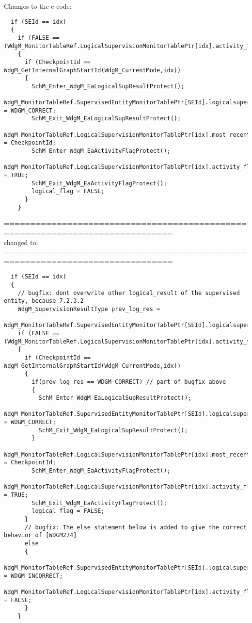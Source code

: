 \documentclass[11pt,a4paper]{article}
\begin{document}
\lstset{language=c}

Changes to the c-code:
\begin{lstlisting}
  if (SEId == idx)
  {
    if (FALSE == (WdgM_MonitorTableRef.LogicalSupervisionMonitorTablePtr[idx].activity_flag))
    {
      if (CheckpointId == WdgM_GetInternalGraphStartId(WdgM_CurrentMode,idx))
      {
        SchM_Enter_WdgM_EaLogicalSupResultProtect();
        WdgM_MonitorTableRef.SupervisedEntityMonitorTablePtr[SEId].logicalsupervision_result = WDGM_CORRECT;
        SchM_Exit_WdgM_EaLogicalSupResultProtect();
        WdgM_MonitorTableRef.LogicalSupervisionMonitorTablePtr[idx].most_recently_reported = CheckpointId;
        SchM_Enter_WdgM_EaActivityFlagProtect();
        WdgM_MonitorTableRef.LogicalSupervisionMonitorTablePtr[idx].activity_flag = TRUE;
        SchM_Exit_WdgM_EaActivityFlagProtect();
        logical_flag = FALSE;
      }
    }
\end{lstlisting}
==============================================================================\\
changed to:\\
==============================================================================
\begin{lstlisting}
  if (SEId == idx)
  {
    // bugfix: dont overwrite other logical_result of the supervised entity, because 7.2.3.2
    WdgM_SupervisionResultType prev_log_res =
      WdgM_MonitorTableRef.SupervisedEntityMonitorTablePtr[SEId].logicalsupervision_result;
    if (FALSE == (WdgM_MonitorTableRef.LogicalSupervisionMonitorTablePtr[idx].activity_flag))
    {
      if (CheckpointId == WdgM_GetInternalGraphStartId(WdgM_CurrentMode,idx))
      {
        if(prev_log_res == WDGM_CORRECT) // part of bugfix above
        {
          SchM_Enter_WdgM_EaLogicalSupResultProtect();
          WdgM_MonitorTableRef.SupervisedEntityMonitorTablePtr[SEId].logicalsupervision_result = WDGM_CORRECT;
          SchM_Exit_WdgM_EaLogicalSupResultProtect();
        }
        WdgM_MonitorTableRef.LogicalSupervisionMonitorTablePtr[idx].most_recently_reported = CheckpointId;
        SchM_Enter_WdgM_EaActivityFlagProtect();
        WdgM_MonitorTableRef.LogicalSupervisionMonitorTablePtr[idx].activity_flag = TRUE;
        SchM_Exit_WdgM_EaActivityFlagProtect();
        logical_flag = FALSE;
      }
      // bugfix: The else statement below is added to give the correct behavior of [WDGM274]
      else
      {
        WdgM_MonitorTableRef.SupervisedEntityMonitorTablePtr[SEId].logicalsupervision_result = WDGM_INCORRECT;
        WdgM_MonitorTableRef.LogicalSupervisionMonitorTablePtr[idx].activity_flag = FALSE;
      }
    }
\end{lstlisting}
\newpage
\end{document}
